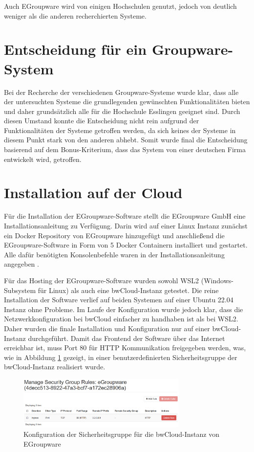 Auch EGroupware wird von einigen Hochschulen genutzt, jedoch von deutlich weniger als die anderen recherchierten Systeme.


\section{Entscheidung für ein Groupware-System}

Bei der Recherche der verschiedenen Groupware-Systeme wurde klar, dass alle der untersuchten Systeme die grundlegenden gewünschten Funktionalitäten bieten und daher grundsätzlich alle für die Hochschule Esslingen geeignet sind.
Durch diesen Umstand konnte die Entscheidung nicht rein aufgrund der Funktionalitäten der Systeme getroffen werden, da sich keines der Systeme in diesem Punkt stark von den anderen abhebt.
Somit wurde final die Entscheidung basierend auf dem Bonus-Kriterium, dass das System von einer deutschen Firma entwickelt wird, getroffen.




\section{Installation auf der Cloud}

Für die Installation der EGroupware-Software stellt die EGroupware GmbH eine Installationsanleitung zu Verfügung.
Darin wird auf einer Linux Instanz zunächst ein Docker Repository von EGroupware hinzugefügt und anschließend die EGroupware-Software in Form von 5 Docker Containern installiert und gestartet.
Alle dafür benötigten Konsolenbefehle waren in der Installationsanleitung angegeben \autocite[]{egroupware-installation}.

Für das Hosting der EGroupware-Software wurden sowohl WSL2 (Windows-Subsystem für Linux) als auch eine bwCloud-Instanz getestet.
Die reine Installation der Software verlief auf beiden Systemen auf einer Ubuntu 22.04 Instanz ohne Probleme.
Im Laufe der Konfiguration wurde jedoch klar, dass die Netzwerkkonfiguration bei bwCloud einfacher zu handhaben ist als bei WSL2.
Daher wurden die finale Installation und Konfiguration nur auf einer bwCloud-Instanz durchgeführt.
Damit das Frontend der Software über das Internet erreichbar ist, muss Port 80 für HTTP Kommunikation freigegeben werden, was, wie in Abbildung \ref{fig:bwcloud_security_group} gezeigt, in einer benutzerdefinierten Sicherheitsgruppe der bwCloud-Instanz realisiert wurde.
\begin{figure}[H]
    \centering
    \includegraphics[width=0.75\textwidth]{images/bwCloud_SecurityGroup.png}
    \caption{Konfiguration der Sicherheitsgruppe für die bwCloud-Instanz von EGroupware}
    \label{fig:bwcloud_security_group}
\end{figure}

